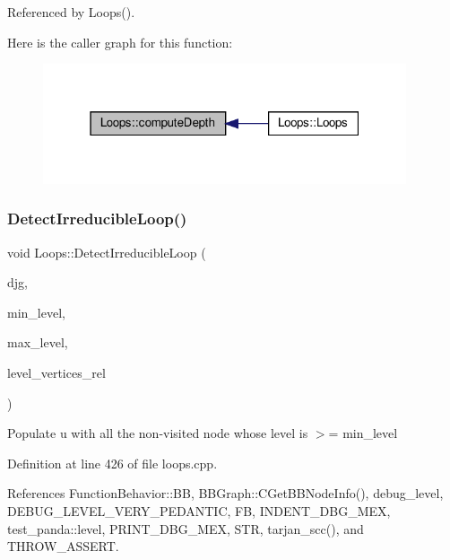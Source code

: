 Referenced by Loops().

Here is the caller graph for this function\+:
\nopagebreak
\begin{figure}[H]
\begin{center}
\leavevmode
\includegraphics[width=304pt]{d3/ded/classLoops_a9409bfa50f8431dfbe3af427ac4c6de9_icgraph}
\end{center}
\end{figure}
\mbox{\label{classLoops_aac2e78898f8485a50d57e97b9e474dd4}} 
\subsubsection{\texorpdfstring{Detect\+Irreducible\+Loop()}{DetectIrreducibleLoop()}}
{\footnotesize\ttfamily void Loops\+::\+Detect\+Irreducible\+Loop (\begin{DoxyParamCaption}\item[{const \hyperlink{basic__block_8hpp_a0e7f233d1b83cad0bfd5aa865f0d3532}{B\+B\+Graph\+Ref}}]{djg,  }\item[{unsigned int}]{min\+\_\+level,  }\item[{unsigned int}]{max\+\_\+level,  }\item[{std\+::vector$<$ std\+::list$<$ \hyperlink{graph_8hpp_abefdcf0544e601805af44eca032cca14}{vertex} $>$$>$ \&}]{level\+\_\+vertices\+\_\+rel }\end{DoxyParamCaption})\hspace{0.3cm}{\ttfamily [private]}}

Populate u with all the non-\/visited node whose level is $>$= min\+\_\+level 

Definition at line 426 of file loops.\+cpp.



References Function\+Behavior\+::\+BB, B\+B\+Graph\+::\+C\+Get\+B\+B\+Node\+Info(), debug\+\_\+level, D\+E\+B\+U\+G\+\_\+\+L\+E\+V\+E\+L\+\_\+\+V\+E\+R\+Y\+\_\+\+P\+E\+D\+A\+N\+T\+IC, FB, I\+N\+D\+E\+N\+T\+\_\+\+D\+B\+G\+\_\+\+M\+EX, test\+\_\+panda\+::level, P\+R\+I\+N\+T\+\_\+\+D\+B\+G\+\_\+\+M\+EX, S\+TR, tarjan\+\_\+scc(), and T\+H\+R\+O\+W\+\_\+\+A\+S\+S\+E\+RT.



